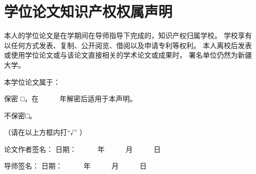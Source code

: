   \chapter{学位论文知识产权权属声明}
    \thispagestyle{noheaderstyle}%
    \linespread{1.5}
    \vspace*{2ex}

    本人的学位论文是在学期间在导师指导下完成的，知识产权归属学校。
    学校享有以任何方式发表、复制、公开阅览、借阅以及申请专利等权利。
    本人离校后发表或使用学位论文或与该论文直接相关的学术论文或成果时，
    署名单位仍然为新疆大学。

    本学位论文属于：

    保密 □，在~~~~~~年解密后适用于本声明。

    不保密□。

    （请在以上方框内打“√” ）

    {{论文作者签名：} \hspace*{10em} {日期：~~~~~~年~~~~~~月~~~~~~日} \hspace*{9em}}

    {{导师签名：} \hspace*{12em} {日期：~~~~~~年~~~~~~月~~~~~~日} \hspace*{9em}}

    \cleardoublepage[plain]%
